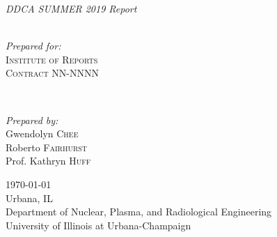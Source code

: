 \documentclass[11pt,letterpaper]{article}
\begin{document}
\begin{titlepage}
	{\LARGE\textit{DDCA SUMMER 2019 Report}}\\[0.4cm] %
	\HRule\\[1.5cm]
	
	
	\begin{minipage}{0.4\textwidth}
		\begin{flushleft}
			\large
			\textit{Prepared for:}\\
			\textsc{Institute of Reports}\\ %
			\textsc{Contract} NN-NNNN\\ %
		\end{flushleft}
	\end{minipage}
	~
	\begin{minipage}{0.4\textwidth}
		\begin{flushright}
			\large
			\textit{Prepared by:}\\
			Gwendolyn \textsc{Chee}\\ %
			Roberto \textsc{Fairhurst}\\ %
			Prof. Kathryn \textsc{Huff} %
		\end{flushright}
	\end{minipage}
	
	
	
	\vfill\vfill\vfill %
	
	{\large\today}\\ %
	\vfill
	{\large Urbana, IL}\\ %
	{\large Department of Nuclear, Plasma, and Radiological Engineering\\
		University of Illinois at Urbana-Champaign}\\ %
	
	
	
	\vfill %
	
\end{titlepage}
\end{document}
